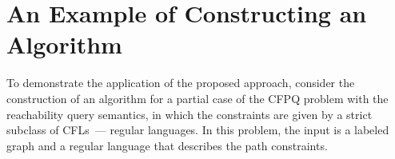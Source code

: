 \section{An Example of Constructing an Algorithm}\label{sec:ch2/sec2}

To demonstrate the application of the proposed approach, consider the construction of an algorithm for a partial case of the CFPQ problem with the reachability query semantics, in which the constraints are given by a strict subclass of CFLs~--- regular languages. In this problem, the input is a labeled graph and a regular language that describes the path constraints.

